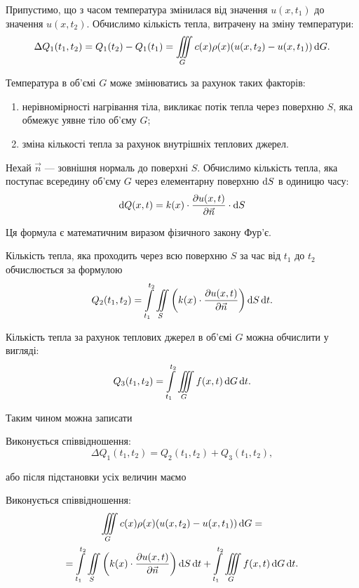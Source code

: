 Припустимо, що з часом температура змінилася від значення $u(x, t_1)$ до значення $u(x, t_2)$. Обчислимо кількість тепла, витрачену на зміну температури:
\begin{equation}
	\Delta Q_1(t_1, t_2) = Q_1(t_2) - Q_1(t_1) = \displaystyle\iiint\limits_G c(x) \rho(x) (u(x, t_2) - u(x, t_1)) \mathop{}\!\mathrm{d} G.
\end{equation}

Температура в об'ємі $G$ може змінюватись за рахунок таких факторів:
\begin{enumerate}
	\item нерівномірності нагрівання тіла, викликає потік тепла через поверхню $S$, яка обмежує уявне тіло об'єму $G$;
	\item зміна кількості тепла за рахунок внутрішніх теплових джерел.
\end{enumerate}

Нехай $\vec n$ --- зовнішня нормаль до поверхні $S$. Обчислимо кількість тепла, яка поступає всередину об'єму $G$ через елементарну поверхню $\mathop{}\!\mathrm{d} S$ в одиницю часу: 
\begin{equation}
	\mathop{}\!\mathrm{d} Q(x, t) = k(x) \cdot \frac{\partial u(x, t)}{\partial \vec n} \cdot \mathop{}\!\mathrm{d} S
\end{equation}

Ця формула є математичним виразом фізичного закону Фур'є. \medskip

Кількість тепла, яка проходить через всю поверхню $S$ за час від $t_1$ до $t_2$ обчислюється за формулою
\begin{equation}
	Q_2(t_1, t_2) = \displaystyle\int\limits_{t_1}^{t_2} \displaystyle\iint\limits_S \left( k(x) \cdot \frac{\partial u(x, t)}{\partial \vec n} \right) \mathop{}\!\mathrm{d} S \mathop{}\!\mathrm{d} t.
\end{equation}

Кількість тепла за рахунок теплових джерел в об'ємі $G$ можна обчислити у вигляді:
\begin{equation}
	Q_3(t_1, t_2) = \displaystyle\int\limits_{t_1}^{t_2} \displaystyle\iiint\limits_G f(x, t) \mathop{}\!\mathrm{d} G \mathop{}\!\mathrm{d} t.
\end{equation}

Таким чином можна записати 
\begin{law*}
	Виконується співвідношення:
	\begin{equation}
		\Delta Q_1(t_1, t_2) = Q_2(t_1, t_2) + Q_3(t_1, t_2),
	\end{equation}
\end{law*}
або після підстановки усіх величин маємо 
\begin{law*}
	Виконується співвідношення:
	\begin{multline}
		\displaystyle\iiint\limits_G c(x) \rho(x) (u(x, t_2) - u(x, t_1)) \mathop{}\!\mathrm{d} G = \\
		= \displaystyle\int\limits_{t_1}^{t_2} \displaystyle\iint\limits_S \left( k(x) \cdot \frac{\partial u(x, t)}{\partial \vec n} \right) \mathop{}\!\mathrm{d} S \mathop{}\!\mathrm{d} t + \displaystyle\int\limits_{t_1}^{t_2} \displaystyle\iiint\limits_G f(x, t) \mathop{}\!\mathrm{d} G \mathop{}\!\mathrm{d} t.
	\end{multline}
\end{law*}

